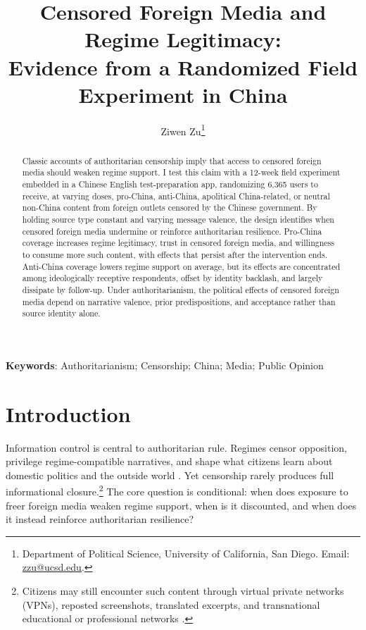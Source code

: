 \documentclass[12pt,american]{article}
\title{\textbf{Censored Foreign Media and Regime Legitimacy:}\\
	\textbf{Evidence from a Randomized Field Experiment in China}}
\author{Ziwen Zu\thanks{Department of Political Science, University of California, San Diego. Email: \href{mailto:zzu@ucsd.edu}{zzu@ucsd.edu}.}}
\date{}
\begin{document}
	\hypersetup{pageanchor=false}
	\maketitle
	\thispagestyle{empty}
	
	\begin{abstract}
		\noindent Classic accounts of authoritarian censorship imply that access to censored foreign media should weaken regime support. I test this claim with a 12-week field experiment embedded in a Chinese English test-preparation app, randomizing 6,365 users to receive, at varying doses, pro-China, anti-China, apolitical China-related, or neutral non-China content from foreign outlets censored by the Chinese government. By holding source type constant and varying message valence, the design identifies when censored foreign media undermine or reinforce authoritarian resilience. Pro-China coverage increases regime legitimacy, trust in censored foreign media, and willingness to consume more such content, with effects that persist after the intervention ends. Anti-China coverage lowers regime support on average, but its effects are concentrated among ideologically receptive respondents, offset by identity backlash, and largely dissipate by follow-up. Under authoritarianism, the political effects of censored foreign media depend on narrative valence, prior predispositions, and acceptance rather than source identity alone.
	\end{abstract}
	
	
	
	\textbf{Keywords}: Authoritarianism; Censorship; China; Media; Public Opinion
	
	\setcounter{page}{0}
	\thispagestyle{empty}
	\newpage
	\doublespacing
	\setcounter{page}{1}
	\renewcommand{\thepage}{\arabic{page}}
	\hypersetup{pageanchor=true}
	
	\section*{Introduction}
	
Information control is central to authoritarian rule. Regimes censor opposition, privilege regime-compatible narratives, and shape what citizens learn about domestic politics and the outside world \citep{BesleyPrat2006,gurievtreisman2019,huang2015signal,kingpanroberts2013,roberts2018,Roberts2020ARPS,stockmann2013}. Yet censorship rarely produces full informational closure.\footnote{Citizens may still encounter such content through virtual private networks (VPNs), reposted screenshots, translated excerpts, and transnational educational or professional networks \citep{chenyang2019,DalNisbet2022SMS,hobbsroberts2018,PanSiegel2020APSR,Roberts2020ARPS}.} The core question is conditional: when does exposure to freer foreign media weaken regime support, when is it discounted, and when does it instead reinforce authoritarian resilience?
\end{document}
